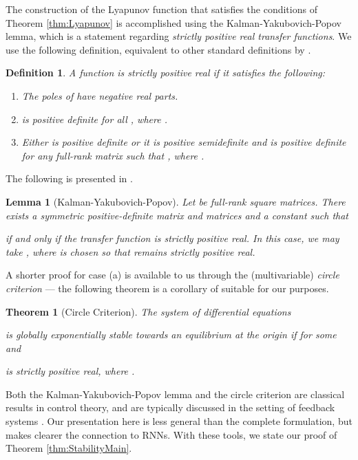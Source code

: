 \documentclass{article} \usepackage{iclr2021_conference,times}
\newtheorem{theorem}{Theorem}
\newtheorem{definition}{Definition}
\newtheorem{lemma}{Lemma}
\begin{document}
The construction of the Lyapunov function  that satisfies the conditions of Theorem \ref{thm:Lyapunov} is accomplished using the Kalman-Yakubovich-Popov lemma, which is a statement regarding \emph{strictly positive real transfer functions}. We use the following definition, equivalent to other standard definitions by \cite[Lemma 6.1]{khalil2002nonlinear}.
\begin{definition}
A function  is \emph{strictly positive real} if it satisfies the following:
\begin{enumerate}[label=(\roman*)]
    \item The poles of  have negative real parts.
    \item  is positive definite for all , where .
    \item Either  is positive definite or it is positive semidefinite and  is positive definite for any  full-rank matrix  such that , where .
\end{enumerate}
\end{definition}
The following is presented in \cite[Lemma 6.3]{khalil2002nonlinear}. 
\begin{lemma}[Kalman-Yakubovich-Popov]
\label{lem:KYP}
Let  be full-rank square matrices. There exists a symmetric positive-definite matrix  and matrices  and a constant  such that

if and only if the \emph{transfer function}  is strictly positive real. In this case, we may take , where  is chosen so that  remains strictly positive real. 
\end{lemma}
A shorter proof for case (a) is available to us through the (multivariable) \emph{circle criterion} --- the following theorem is a corollary of \cite[Theorem 7.1]{khalil2002nonlinear} suitable for our purposes.
\begin{theorem}[Circle Criterion]
\label{thm:CircleCriterion}
The system of differential equations

is globally exponentially stable towards an equilibrium at the origin if  for some  and

is strictly positive real, where . 
\end{theorem}

Both the Kalman-Yakubovich-Popov lemma and the circle criterion are classical results in control theory, and are typically discussed in the setting of feedback systems \cite[Chapter 6, 7]{khalil2002nonlinear}. Our presentation here is less general than the complete formulation, but makes clearer the connection to RNNs. With these tools, we state our proof of Theorem \ref{thm:StabilityMain}.
\end{document}
